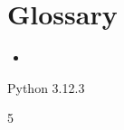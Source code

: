 \documentclass[letterpaper,10pt,english]{sphinxmanual}
\begin{document}
\chapter{Glossary}
\label{\detokenize{index:glossary}}\begin{itemize}
\item {} 
\sphinxAtStartPar
{}

\end{itemize}

\sphinxAtStartPar
{}

\begin{sphinxVerbatim}[commandchars=\\\{\}]
Python 3.12.3
\end{sphinxVerbatim}

\begin{sphinxVerbatim}[commandchars=\\\{\}]
5
\end{sphinxVerbatim}



\renewcommand{\indexname}{Index}
\printindex
\end{document}
